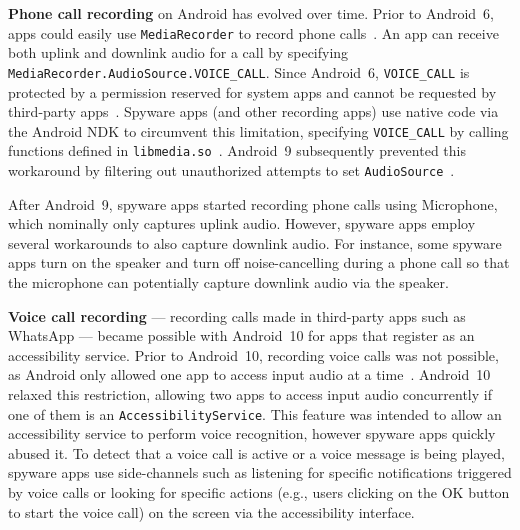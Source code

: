 \textbf{Phone call recording} on Android has evolved over time.
%
Prior to Android~6, apps could easily use \texttt{MediaRecorder} to
record phone calls~\cite{MediaRec53:online}.
An app can receive both uplink and downlink audio
for a call by specifying \texttt{MediaRecorder.AudioSource.VOICE\_CALL}. Since Android~6, \texttt{VOICE\_CALL} is protected by a permission
reserved for system apps and cannot be requested by third-party
apps~\cite{VOICECAL55:online}. Spyware apps (and other recording apps) use
native code via the Android NDK to circumvent this limitation, specifying
\texttt{VOICE\_CALL} by calling functions defined in
\texttt{libmedia.so}~\cite{ViktorDe77:online}.
Android~9 subsequently prevented this workaround by filtering out
unauthorized attempts to set \texttt{AudioSource}~\cite{coplukAC3:online,
  services10:online}.

After Android~9, spyware apps started recording phone calls using
Microphone, which nominally only captures uplink audio.  However, spyware apps
employ several workarounds to also capture downlink audio.  For instance, some
spyware apps turn on the speaker and turn off noise-cancelling during a phone
call so that the microphone can potentially capture downlink audio via the
speaker.


\textbf{Voice call recording} --- recording calls made in third-party apps such as WhatsApp --- became possible with
Android~10 for apps that register as an accessibility service.
Prior to Android~10,
recording voice calls was not possible, as Android only allowed one app to
access input audio at a time~\cite{Sharinga60:online}.  Android~10 relaxed this
restriction, allowing two apps to access input audio concurrently if one of them
is an \texttt{AccessibilityService}.  This feature was intended to allow an
accessibility service to perform voice recognition, however spyware apps quickly
abused it.  To detect that a voice call is active or a voice message is being
played, spyware apps use side-channels such as listening for specific
notifications triggered by voice calls or looking for specific actions (e.g.,
users clicking on the OK button to start the voice call) on the screen via
the accessibility interface.

